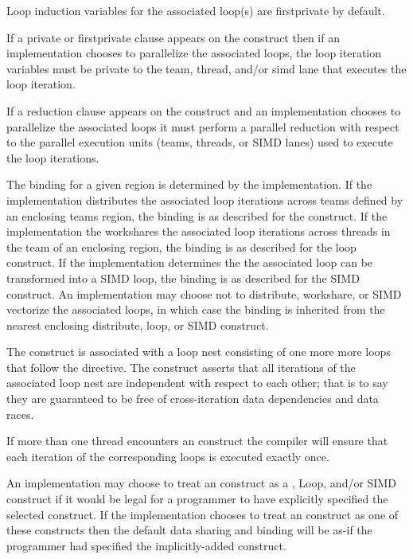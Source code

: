 Loop induction variables for the associated loop(s) are firstprivate by
default.

If a private or firstprivate clause appears on the  construct then
if an implementation chooses to parallelize the associated loops, the loop
iteration variables must be private to the team, thread, and/or simd lane that
executes the loop iteration.

If a reduction clause appears on the  construct and an
implementation chooses to parallelize the associated loops it must perform a
parallel reduction with respect to the parallel execution units (teams,
threads, or SIMD lanes) used to execute the loop iterations.


\binding
The binding for a given  region is determined by the implementation.
If the implementation distributes the associated loop iterations across teams
defined by an enclosing teams region, the binding is as described for the
 construct. If the implementation the workshares the associated loop
iterations across threads in the team of an enclosing  region, the
binding is as described for the loop construct. If the implementation
determines the the associated loop can be transformed into a SIMD loop, the
binding is as described for the SIMD construct. An implementation may choose
not to distribute, workshare, or SIMD vectorize the associated loops, in which
case the binding is inherited from the nearest enclosing distribute, loop, or
SIMD construct.

\descr
The  construct is associated with a loop nest consisting of one more
more loops that follow the directive. The construct asserts that all iterations
of the associated loop nest are independent with respect to each other; that is
to say they are guaranteed to be free of cross-iteration data dependencies and
data races. 

If more than one thread encounters an  construct the compiler will
ensure that each iteration of the corresponding loops is executed exactly once.

An implementation may choose to treat an  construct as a
,
Loop, and/or SIMD construct if it would be legal for a programmer to have
explicitly specified the selected construct. If the implementation chooses to
treat an  construct as one of these constructs then the default data
sharing and binding will be as-if the programmer had specified the
implicitly-added construct.

